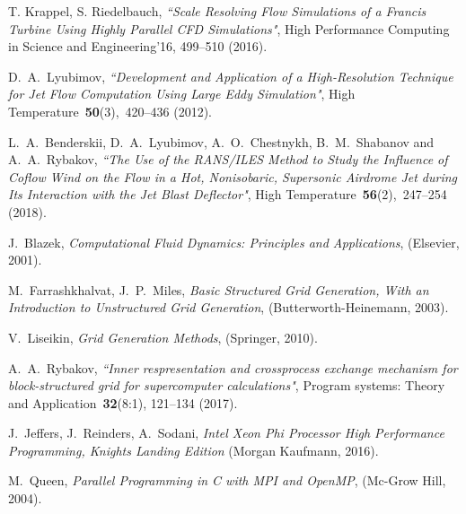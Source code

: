 \documentclass[
11pt,%
tightenlines,%
twoside,%
onecolumn,%
nofloats,%
nobibnotes,%
nofootinbib,%
superscriptaddress,%
noshowpacs,%
centertags]%
{revtex4}
\begin{document}
\begin{thebibliography}{99}


T. Krappel, S. Riedelbauch, {\it ``Scale Resolving Flow Simulations of a Francis Turbine Using Highly Parallel CFD Simulations"}, High Performance Computing in Science and Engineering'16, 499--510 (2016).

D.~A.~Lyubimov, {\it ``Development and Application of a High-Resolution Technique for Jet Flow Computation Using Large Eddy Simulation"}, High Temperature~{\bf 50}(3),~420--436 (2012).

L.~A.~Benderskii, D.~A.~Lyubimov, A.~O.~Chestnykh, B.~M.~Shabanov and A.~A.~Rybakov, {\it ``The Use of the RANS/ILES Method to Study the Influence of Coflow Wind on the Flow in a Hot, Nonisobaric, Supersonic Airdrome Jet during Its Interaction with the Jet Blast Deflector"}, High Temperature~{\bf 56}(2),~247--254 (2018).

J.~Blazek, \emph{Computational Fluid Dynamics: Principles and Applications}, (Elsevier, 2001).


M.~Farrashkhalvat, J.~P.~Miles, \emph{Basic Structured Grid Generation, With an Introduction to Unstructured Grid Generation}, (Butterworth-Heinemann, 2003).

V.~Liseikin, \emph{Grid Generation Methods}, (Springer, 2010).

A.~A.~Rybakov, {\it ``Inner respresentation and crossprocess exchange mechanism for block-structured grid for supercomputer calculations"}, Program systems: Theory and Application~{\bf 32}(8:1), 121--134 (2017).

J.~Jeffers, J.~Reinders, A.~Sodani, \emph{Intel Xeon Phi Processor High Performance Programming, Knights Landing Edition} (Morgan Kaufmann, 2016).

M.~Queen, \emph{Parallel Programming in C with MPI and OpenMP}, (Mc-Grow Hill, 2004).

\end{thebibliography}
\end{document}
